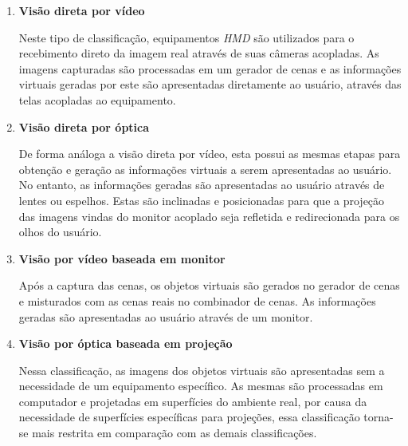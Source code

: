 	\begin{enumerate}
	
		\item \textbf{Visão direta por vídeo} 
		
		Neste tipo de classificação, equipamentos \textit{HMD} são utilizados para o recebimento direto
		da imagem real através de suas câmeras acopladas. As imagens capturadas são processadas em
		um gerador de cenas e as informações virtuais geradas por este são apresentadas diretamente ao
		usuário, através das telas acopladas ao equipamento. 
		
		
		\item \textbf{Visão direta por óptica} 
		
		De forma análoga a visão direta por vídeo, esta possui as mesmas etapas para obtenção e geração
		as informações virtuais a serem apresentadas ao usuário. No entanto, as informações geradas são
		apresentadas ao usuário através de lentes ou espelhos. Estas são inclinadas e posicionadas
		para que a projeção das imagens vindas do monitor acoplado seja refletida e redirecionada para
		os olhos do usuário.
		
		\item \textbf{Visão por vídeo baseada em monitor} 
		
		Após a captura das cenas, os objetos virtuais são gerados no gerador de cenas e misturados com
		as cenas reais no combinador de cenas. As informações geradas são apresentadas ao usuário
		através de um monitor.
		
		\item \textbf{Visão por óptica baseada em projeção} 
		
		Nessa classificação, as imagens dos objetos virtuais são apresentadas sem a necessidade de um
		equipamento específico. As mesmas são processadas em computador e projetadas em superfícies do
		ambiente real, por causa da necessidade de superfícies específicas para projeções, essa
		classificação torna-se mais restrita em comparação com as demais classificações.
		
	\end{enumerate}
